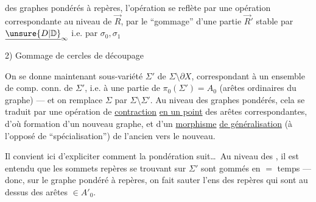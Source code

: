 des graphes pondérés à repères, l'opération  se reflète par une opération correspondante au niveau de $\vec R$, par le ``gommage'' d'une partie $\vec R'$ stable par $\underline{\unsure{D|\mathbb D}}_\infty$ i.e. par $\sigma_0,\sigma_1$

2) Gommage de cercles de découpage

On se donne maintenant  sous-variété  $\Sigma'$ de $\Sigma\setminus\partial X$, correspondant à un ensemble  de comp. conn. de $\Sigma'$, i.e. à une partie  de $\pi_0(\Sigma')=A_0$ (arêtes ordinaires du graphe) --- et on remplace $\Sigma$ par $\Sigma\setminus\Sigma'$. Au niveau des graphes pondérés, cela se traduit par une opération de \uline{contraction} \uline{en un point} des arêtes correspondantes, d'où formation d'un nouveau graphe, et d'un \uline{morphisme} \uline{de généralisation} (à l'opposé de ``spécialisation'') de l'ancien vers le nouveau.

Il convient ici d'expliciter comment la pondération suit\ldots\ Au niveau des  , il est entendu que les sommets repères se trouvant sur $\Sigma'$ sont gommés en $=$ temps --- donc, sur le graphe pondéré à repères, on fait sauter l'ens des repères qui sont au dessus des arêtes $\in A'_0$.

